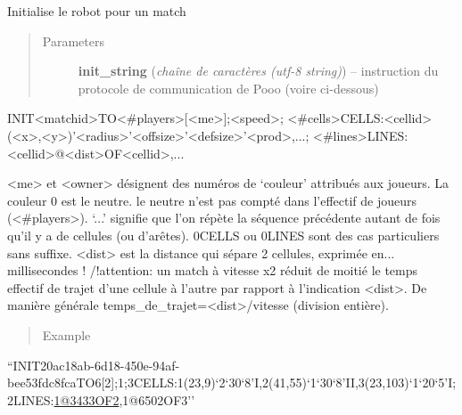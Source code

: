 \documentclass[letterpaper,10pt,english]{sphinxmanual}
\begin{document}
\begin{fulllineitems}
\label{index:graphique_lolipooo.init_pooo}
Initialise le robot pour un match
\begin{quote}\begin{description}
\item[{Parameters}] \leavevmode
\textbf{init\_string} (\emph{chaîne de caractères (utf-8 string)}) -- instruction du protocole de communication de Pooo (voire ci-dessous)

\end{description}\end{quote}

INIT\textless{}matchid\textgreater{}TO\textless{}\#players\textgreater{}{[}\textless{}me\textgreater{}{]};\textless{}speed\textgreater{};    \textless{}\#cells\textgreater{}CELLS:\textless{}cellid\textgreater{}(\textless{}x\textgreater{},\textless{}y\textgreater{})'\textless{}radius\textgreater{}'\textless{}offsize\textgreater{}'\textless{}defsize\textgreater{}'\textless{}prod\textgreater{},...;    \textless{}\#lines\textgreater{}LINES:\textless{}cellid\textgreater{}@\textless{}dist\textgreater{}OF\textless{}cellid\textgreater{},...

\textless{}me\textgreater{} et \textless{}owner\textgreater{} désignent des numéros de `couleur' attribués aux joueurs. La couleur 0 est le neutre.
le neutre n'est pas compté dans l'effectif de joueurs (\textless{}\#players\textgreater{}).
`...' signifie que l'on répète la séquence précédente autant de fois qu'il y a de cellules (ou d'arêtes).
0CELLS ou 0LINES sont des cas particuliers sans suffixe.
\textless{}dist\textgreater{} est la distance qui sépare 2 cellules, exprimée en... millisecondes !
/!attention: un match à vitesse x2 réduit de moitié le temps effectif de trajet d'une cellule à l'autre par rapport à l'indication \textless{}dist\textgreater{}.
De manière générale temps\_de\_trajet=\textless{}dist\textgreater{}/vitesse (division entière).
\begin{quote}\begin{description}
\item[{Example}] \leavevmode
\end{description}\end{quote}

``INIT20ac18ab-6d18-450e-94af-bee53fdc8fcaTO6{[}2{]};1;3CELLS:1(23,9)`2`30`8'I,2(41,55)`1`30`8'II,3(23,103)`1`20`5'I;2LINES:\href{mailto:1@3433OF2}{1@3433OF2},1@6502OF3''

\end{fulllineitems}
\end{document}
